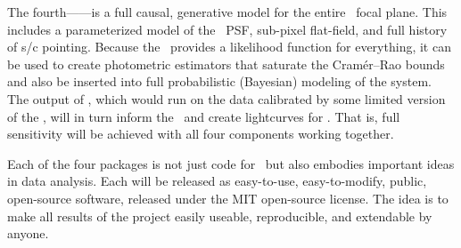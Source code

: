 \documentclass[letterpaper,12pt]{article}
\begin{document}
The fourth---\kpsf---is a full causal, generative model for the entire \Kepler\
focal plane.
This includes a parameterized model of the \Kepler\ PSF, sub-pixel flat-field,
and full history of s/c pointing.
Because the \kpsf\ provides a likelihood function for everything, it can be used
to create photometric estimators that saturate the Cram\'er--Rao bounds and also
be inserted into full probabilistic (Bayesian) modeling of the system.
The output of \kpsf, which would run on the data calibrated by some limited
version of the \PLM, will in turn inform the \OWL\ and create lightcurves for
\George.
That is, full sensitivity will be achieved with all four components working
together.

Each of the four packages is not just code for \Kepler\ but also embodies
important ideas in data analysis.
Each will be released as easy-to-use, easy-to-modify, public, open-source
software, released under the MIT open-source license.
The idea is to make all results of the project easily useable, reproducible, and
extendable by anyone.
\end{document}
